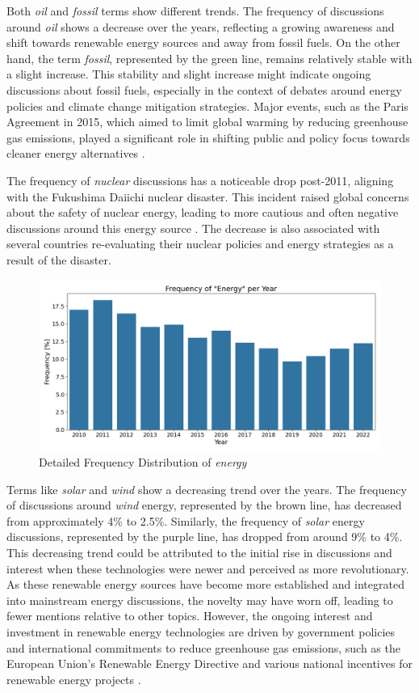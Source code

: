 Both \emph{oil} and \emph{fossil} terms show different trends. The frequency of discussions around \emph{oil} shows a decrease over the years, reflecting a growing awareness and shift towards renewable energy sources and away from fossil fuels. On the other hand, the term \emph{fossil}, represented by the green line, remains relatively stable with a slight increase. This stability and slight increase might indicate ongoing discussions about fossil fuels, especially in the context of debates around energy policies and climate change mitigation strategies. Major events, such as the Paris Agreement in 2015, which aimed to limit global warming by reducing greenhouse gas emissions, played a significant role in shifting public and policy focus towards cleaner energy alternatives \cite{unfccc2015paris}.

The frequency of \emph{nuclear} discussions has a noticeable drop post-2011, aligning with the Fukushima Daiichi nuclear disaster. This incident raised global concerns about the safety of nuclear energy, leading to more cautious and often negative discussions around this energy source \cite{WNA2012}. The decrease is also associated with several countries re-evaluating their nuclear policies and energy strategies as a result of the disaster.

\begin{figure}[h]
    \includegraphics[width=\textwidth]{images/topic_details/ngram/frequency_bar_energy.png}
    \caption{Detailed Frequency Distribution of \emph{energy}}
    \label{fig:frequency_energy}
\end{figure}

Terms like \emph{solar} and \emph{wind} show a decreasing trend over the years. The frequency of discussions around \emph{wind} energy, represented by the brown line, has decreased from approximately 4\% to 2.5\%. Similarly, the frequency of \emph{solar} energy discussions, represented by the purple line, has dropped from around 9\% to 4\%. This decreasing trend could be attributed to the initial rise in discussions and interest when these technologies were newer and perceived as more revolutionary. As these renewable energy sources have become more established and integrated into mainstream energy discussions, the novelty may have worn off, leading to fewer mentions relative to other topics. However, the ongoing interest and investment in renewable energy technologies are driven by government policies and international commitments to reduce greenhouse gas emissions, such as the European Union's Renewable Energy Directive and various national incentives for renewable energy projects \cite{irena2018roadmap}.

